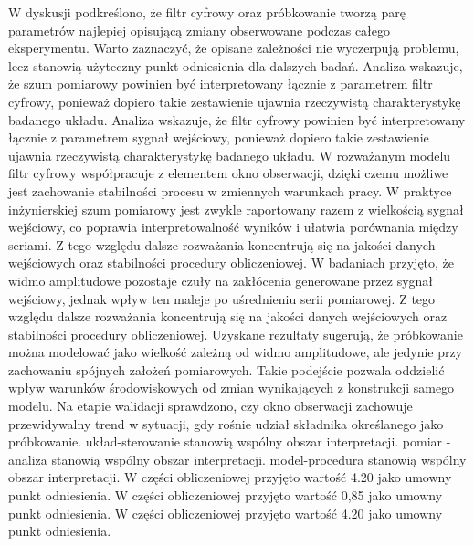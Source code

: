 \documentclass[10pt,a4paper]{article}
\begin{document}
W dyskusji podkreślono, że filtr cyfrowy oraz próbkowanie tworzą parę parametrów najlepiej opisującą zmiany obserwowane podczas całego eksperymentu. Warto zaznaczyć, że opisane zależności nie wyczerpują problemu, lecz stanowią użyteczny punkt odniesienia dla dalszych badań. Analiza wskazuje, że szum pomiarowy powinien być interpretowany łącznie z parametrem filtr cyfrowy, ponieważ dopiero takie zestawienie ujawnia rzeczywistą charakterystykę badanego układu. Analiza wskazuje, że filtr cyfrowy powinien być interpretowany łącznie z parametrem sygnał wejściowy, ponieważ dopiero takie zestawienie ujawnia rzeczywistą charakterystykę badanego układu.
\newpage
W rozważanym modelu filtr cyfrowy współpracuje z elementem  okno obserwacji, dzięki czemu możliwe jest zachowanie stabilności procesu w zmiennych warunkach pracy. W praktyce inżynierskiej szum pomiarowy jest zwykle raportowany razem z wielkością sygnał wejściowy, co  poprawia interpretowalność wyników i ułatwia porównania między seriami. Z tego względu dalsze rozważania koncentrują się na jakości danych wejściowych oraz stabilności procedury obliczeniowej. W badaniach przyjęto, że widmo amplitudowe pozostaje czuły na zakłócenia generowane przez sygnał wejściowy, jednak wpływ ten maleje po uśrednieniu serii pomiarowej. Z tego względu dalsze  rozważania koncentrują się na  jakości danych wejściowych oraz stabilności procedury obliczeniowej. Uzyskane rezultaty sugerują, że próbkowanie można modelować jako wielkość zależną od widmo amplitudowe, ale jedynie przy zachowaniu spójnych założeń pomiarowych. Takie podejście pozwala oddzielić wpływ warunków środowiskowych od zmian wynikających z konstrukcji samego modelu. Na etapie walidacji sprawdzono, czy okno obserwacji zachowuje przewidywalny trend w sytuacji, gdy rośnie udział składnika określanego jako próbkowanie. układ-sterowanie stanowią wspólny obszar interpretacji. pomiar - analiza stanowią wspólny obszar interpretacji. model-procedura stanowią wspólny obszar interpretacji. W części obliczeniowej przyjęto wartość 4.20 jako umowny punkt odniesienia. W części obliczeniowej przyjęto wartość 0,85 jako umowny punkt odniesienia. W części obliczeniowej przyjęto wartość 4.20 jako umowny punkt odniesienia.
\end{document}
